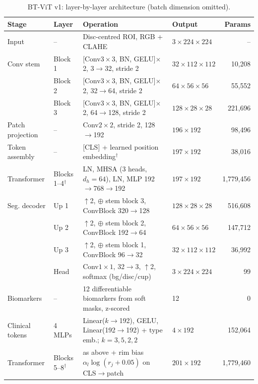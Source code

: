 \documentclass[10pt]{article}
\begin{document}
\begin{table}[h]
\centering
\begin{threeparttable}
\caption{BT-ViT v1: layer-by-layer architecture (batch dimension omitted).}
\label{tab:v1layers}
\footnotesize
\setlength{\tabcolsep}{4pt}
\begin{tabular}{@{}llp{7.4cm}lr@{}}
\toprule
Stage & Layer & Operation & Output & Params \\
\midrule
Input & -- & Disc-centred ROI, RGB + CLAHE & $3{\times}224{\times}224$ & -- \\
Conv stem & Block 1 & [Conv$3{\times}3$, BN, GELU]$\times$2, 3$\to$32, stride 2 & $32{\times}112{\times}112$ & 10{,}208 \\
 & Block 2 & [Conv$3{\times}3$, BN, GELU]$\times$2, 32$\to$64, stride 2 & $64{\times}56{\times}56$ & 55{,}552 \\
 & Block 3 & [Conv$3{\times}3$, BN, GELU]$\times$2, 64$\to$128, stride 2 & $128{\times}28{\times}28$ & 221{,}696 \\
Patch projection & -- & Conv$2{\times}2$, stride 2, 128$\to$192 & $196{\times}192$ & 98{,}496 \\
Token assembly & -- & [CLS] + learned position embedding$^{\dagger}$ & $197{\times}192$ & 38{,}016 \\
Transformer & Blocks 1--4$^{\dagger}$ & LN, MHSA (3 heads, $d_h{=}64$), LN, MLP 192$\to$768$\to$192 & $197{\times}192$ & 1{,}779{,}456 \\
Seg. decoder & Up 1 & $\uparrow$2, $\oplus$ stem block 3, ConvBlock 320$\to$128 & $128{\times}28{\times}28$ & 516{,}608 \\
 & Up 2 & $\uparrow$2, $\oplus$ stem block 2, ConvBlock 192$\to$64 & $64{\times}56{\times}56$ & 147{,}712 \\
 & Up 3 & $\uparrow$2, $\oplus$ stem block 1, ConvBlock 96$\to$32 & $32{\times}112{\times}112$ & 36{,}992 \\
 & Head & Conv$1{\times}1$, 32$\to$3, $\uparrow$2, softmax (bg/disc/cup) & $3{\times}224{\times}224$ & 99 \\
Biomarkers & -- & 12 differentiable biomarkers from soft masks, z-scored & 12 & 0 \\
Clinical tokens & 4 MLPs & Linear($k\to$192), GELU, Linear(192$\to$192) + type emb.; $k{=}3,5,2,2$ & $4{\times}192$ & 152{,}064 \\
Transformer & Blocks 5--8$^{\dagger}$ & as above + rim bias $\alpha_l\log(r_j{+}0.05)$ on CLS$\to$patch & $201{\times}192$ & 1{,}779{,}460 \\

\end{tabular}
\end{threeparttable}
\end{table}
\end{document}
